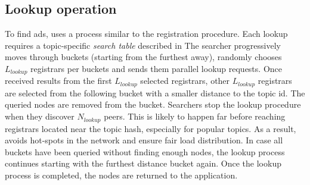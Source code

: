 \subsection{Lookup operation}\label{sec:lookup}

To find ads, \sysname uses a process similar to the registration procedure. 
Each lookup requires a topic-specific \emph{search table} described in 
The searcher progressively moves through buckets (starting from the furthest away), randomly chooses $L_\textit{lookup}$ registrars per buckets and sends them parallel lookup requests. 
Once received results from the first $L_\textit{lookup}$ selected registrars,  other $L_\textit{lookup}$ registrars are selected from the  following bucket with a smaller distance to the topic id.
The queried nodes are removed from the bucket.
Searchers stop the lookup procedure when they discover $N_\textit{lookup}$ peers. This is likely to happen far before reaching registrars located near the topic hash, especially for popular topics. As a result, \sysname avoids hot-spots in the network and ensure fair load distribution. 
In case all buckets have been queried without finding enough nodes, the lookup process continues starting with the furthest distance bucket again. 
Once the lookup process is completed, the nodes are returned to the application.

